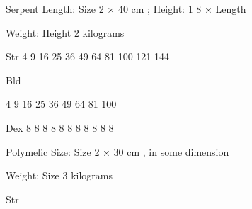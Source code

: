 \documentclass[twoside]{book}
\begin{document}
                  
                   Serpent   
                    Length:   
                         Size  2 
                             ×  40  cm
                              ; Height:  
                            1  8   
                           ×  Length   
                    
                  
                  
                    
                     Weight:    Height
                      2    kilograms  
                     
                    
                  
                  
                   Str   
                   4   
                   9   
                   16   
                   25   
                   36   
                   49   
                   64   
                   81   
                   100   
                   121   
                   144   
                  
                  
                   Bld   
                  
                    
                    
                  
                    
                    
                   4   
                   9   
                   16   
                   25   
                   36   
                   49   
                   64   
                   81   
                   100   
                  
                  
                   Dex   
                   8   
                   8   
                   8   
                   8   
                   8   
                   8   
                   8   
                   8   
                   8   
                   8   
                   8   
                  
                  
                   Polymelic   
                    Size:   
                         Size  2 
                            ×  30  cm
                             , in some dimension
                    
                  
                  
                    
                     Weight:    Size
                      3    kilograms  
                     
                    
                  
                  
                   Str   
                  
\end{document}
